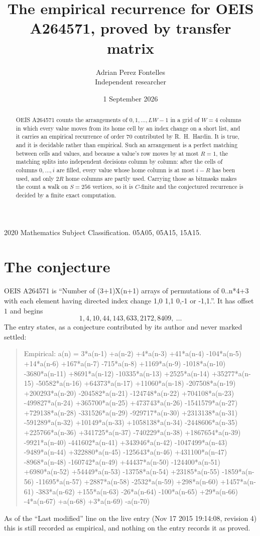 \documentclass[11pt,a4paper]{article}
\title{The empirical recurrence for OEIS A264571, proved by transfer matrix}
\author{Adrian Perez Fontelles\\ \small Independent researcher}
\date{1 September 2026}
\theoremstyle{plain}
\theoremstyle{definition}
\begin{document}
\maketitle

\begin{abstract}
OEIS A264571 counts the arrangements of $0,1,\dots,LW-1$ in a grid of $W=4$ columns in which
every value moves from its home cell by an index change on a short list, and it carries an
empirical recurrence of order $70$ contributed by R.~H.~Hardin. It is true, and it is
decidable rather than empirical. Such an arrangement is a perfect matching between cells and
values, and because a value's row moves by at most $R=1$, the matching splits into
independent decisions column by column: after the cells of columns $0,\dots,i$ are filled,
every value whose home column is at most $i-R$ has been used, and only $2R$ home columns are
partly used. Carrying those as bitmasks makes the count a walk on $S=256$ vertices, so it is
$C$-finite and the conjectured recurrence is decided by a finite exact computation.
\end{abstract}

\noindent\small 2020 Mathematics Subject Classification. 05A05, 05A15, 15A15.\normalsize

\section{The conjecture}

OEIS A264571 is ``Number of (3+1)X(n+1) arrays of permutations of 0..n*4+3 with each element having directed index change 1,0 1,1 0,-1 or -1,1.''. It has offset $1$ and begins
\[
1, 4, 10, 44, 143, 633, 2172, 8409,\ \dots
\]
The entry states, as a conjecture contributed by its author and never marked settled:
\begin{quote}
Empirical: a(n) = 3*a(n-1) +a(n-2) +4*a(n-3) +41*a(n-4) -104*a(n-5) +14*a(n-6) +167*a(n-7) -715*a(n-8) +1169*a(n-9) -1018*a(n-10) -3680*a(n-11) +8691*a(n-12) -10335*a(n-13) +2525*a(n-14) +35277*a(n-15) -50582*a(n-16) +64373*a(n-17) +11060*a(n-18) -207508*a(n-19) +200293*a(n-20) -204582*a(n-21) -124748*a(n-22) +704108*a(n-23) -499827*a(n-24) +365700*a(n-25) +473743*a(n-26) -1541579*a(n-27) +729138*a(n-28) -331526*a(n-29) -929717*a(n-30) +2313138*a(n-31) -591289*a(n-32) +10149*a(n-33) +1058138*a(n-34) -2448606*a(n-35) +225766*a(n-36) +341725*a(n-37) -740229*a(n-38) +1867654*a(n-39) -9921*a(n-40) -441602*a(n-41) +343946*a(n-42) -1047499*a(n-43) -9489*a(n-44) +322880*a(n-45) -125643*a(n-46) +431100*a(n-47) -8968*a(n-48) -160742*a(n-49) +44437*a(n-50) -124400*a(n-51) +6980*a(n-52) +54449*a(n-53) -13758*a(n-54) +23185*a(n-55) -1859*a(n-56) -11695*a(n-57) +2887*a(n-58) -2532*a(n-59) +298*a(n-60) +1457*a(n-61) -383*a(n-62) +155*a(n-63) -26*a(n-64) -100*a(n-65) +29*a(n-66) -4*a(n-67) +a(n-68) +3*a(n-69) -a(n-70)
\end{quote}
As of the ``Last modified'' line on the live entry (Nov 17 2015 19:14:08, revision 4) this is still
recorded as empirical, and nothing on the entry records it as proved.
\end{document}
